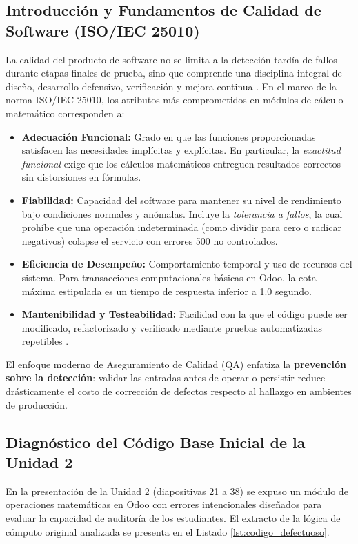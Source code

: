 \documentclass{article}
\begin{document}
\subsection{Introducción y Fundamentos de Calidad de Software (ISO/IEC 25010)}
La calidad del producto de software no se limita a la detección tardía de fallos durante etapas finales de prueba, sino que comprende una disciplina integral de diseño, desarrollo defensivo, verificación y mejora continua \cite{iso25010}. En el marco de la norma ISO/IEC 25010, los atributos más comprometidos en módulos de cálculo matemático corresponden a:
\begin{itemize}
    \item \textbf{Adecuación Funcional:} Grado en que las funciones proporcionadas satisfacen las necesidades implícitas y explícitas. En particular, la \textit{exactitud funcional} exige que los cálculos matemáticos entreguen resultados correctos sin distorsiones en fórmulas.
    \item \textbf{Fiabilidad:} Capacidad del software para mantener su nivel de rendimiento bajo condiciones normales y anómalas. Incluye la \textit{tolerancia a fallos}, la cual prohíbe que una operación indeterminada (como dividir para cero o radicar negativos) colapse el servicio con errores 500 no controlados.
    \item \textbf{Eficiencia de Desempeño:} Comportamiento temporal y uso de recursos del sistema. Para transacciones computacionales básicas en Odoo, la cota máxima estipulada es un tiempo de respuesta inferior a 1.0 segundo.
    \item \textbf{Mantenibilidad y Testeabilidad:} Facilidad con la que el código puede ser modificado, refactorizado y verificado mediante pruebas automatizadas repetibles \cite{myers2011}.
\end{itemize}

El enfoque moderno de Aseguramiento de Calidad (QA) enfatiza la \textbf{prevención sobre la detección}: validar las entradas antes de operar o persistir reduce drásticamente el costo de corrección de defectos respecto al hallazgo en ambientes de producción.

\subsection{Diagnóstico del Código Base Inicial de la Unidad 2}
En la presentación de la Unidad 2 (diapositivas 21 a 38) se expuso un módulo de operaciones matemáticas en Odoo con errores intencionales diseñados para evaluar la capacidad de auditoría de los estudiantes. El extracto de la lógica de cómputo original analizada se presenta en el Listado \ref{lst:codigo_defectuoso}.
\end{document}
